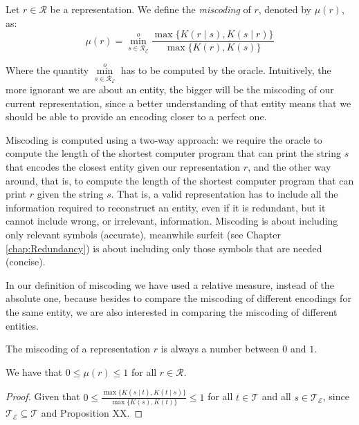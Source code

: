 \begin{definition} [Miscoding]
\label{def:miscoding}
Let $r \in \mathcal{R}$ be a representation. We define the \emph{miscoding} of $r$, denoted by $\mu(r)$, as:
\[
\mu(r) = \overset{o}{ \underset{s \in \mathcal{R}_\mathcal{E}} \min} \frac{ \max\{ K(r \mid s), K(s \mid r) \} } { \max\{ K(r), K(s) \} }
\]
\end{definition}

Where the quantity $\overset{o}{ \underset{s \in \mathcal{R}_\mathcal{E}} \min}$ has to be computed by the oracle. Intuitively, the more ignorant we are about an entity, the bigger will be the miscoding of our current representation, since a better understanding of that entity means that we should be able to provide an encoding closer to a perfect one.

Miscoding is computed using a two-way approach: we require the oracle to compute the length of the shortest computer program that can print the string $s$ that encodes the closest entity given our representation $r$, and the other way around, that is, to compute the length of the shortest computer program that can print $r$ given the string $s$. That is, a valid representation has to include all the information required to reconstruct an entity, even if it is redundant, but it cannot include wrong, or irrelevant, information. Miscoding is about including only relevant symbols (accurate), meanwhile surfeit (see Chapter \ref{chap:Redundancy}) is about including only those symbols that are needed (concise).

In our definition of miscoding we have used a relative measure, instead of the absolute one, because besides to compare the miscoding of different encodings for the same entity, we are also interested in comparing the miscoding of different entities.

The miscoding of a representation $r$ is always a number between $0$ and $1$.

\begin{proposition}
\label{prop:range_miscoding}
We have that $0 \leq \mu(r) \leq 1$ for all $r \in \mathcal{R}$.
\end{proposition}
\begin{proof}
Given that $0 \leq \frac{ \max\{ K(s \mid t), K(t \mid s) \} } { \max\{ K(s), K(t) \} } \leq 1$ for all $t \in \mathcal{T}$ and all $s \in \mathcal{T}_\mathcal{E}$, since $\mathcal{T}_\mathcal{E} \subseteq \mathcal{T}$ and Proposition {\color{red} XX}.
\end{proof}

